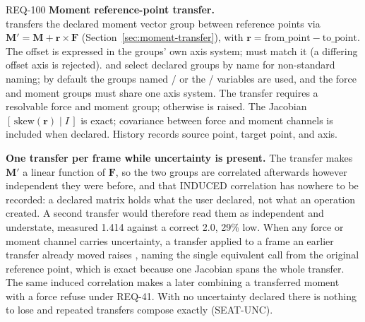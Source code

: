 \begin{reqbox}{REQ-100}{\stable}
\textbf{Moment reference-point transfer.}\\
 transfers the declared moment
vector group between reference points via
$\mathbf{M}' = \mathbf{M} + \mathbf{r} \times \mathbf{F}$
(Section~\ref{sec:moment-transfer}), with
$\mathbf{r} = \mathrm{from\_point} - \mathrm{to\_point}$. The offset is
expressed in the groups' own axis system;  must match it
(a differing offset axis is rejected).  and 
select declared groups by name for non-standard naming; by default the
groups named  /  or the
 /  variables are used, and the
force and moment groups must share one axis system. The transfer
requires a resolvable force and moment group; otherwise
 is raised. The Jacobian $[\,\text{skew}(\mathbf{r})
\mid I\,]$ is exact; covariance between force and moment channels is
included when declared. History records source point, target point,
and axis.

\textbf{One transfer per frame while uncertainty is present.} The
transfer makes $\mathbf{M}'$ a linear function of $\mathbf{F}$, so the
two groups are correlated afterwards however independent they were
before, and that INDUCED correlation has nowhere to be recorded: a
declared matrix holds what the user declared, not what an operation
created. A second transfer would therefore read them as independent and
understate, measured 1.414 against a correct 2.0, 29\% low. When any
force or moment channel carries uncertainty, a transfer applied to a
frame an earlier transfer already moved raises
, naming the single equivalent call from
the original reference point, which is exact because one Jacobian spans
the whole transfer. The same induced correlation makes a later
 combining a transferred moment with a force refuse under
REQ-41. With no uncertainty declared there is nothing to lose and
repeated transfers compose exactly (SEAT-UNC).
\end{reqbox}

